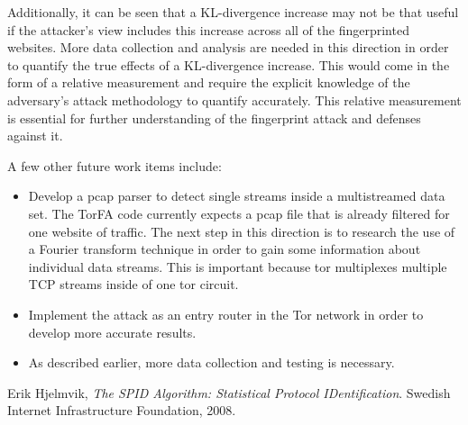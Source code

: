 \documentclass{usenixsubmit}
\begin{document}
Additionally, it can be seen that a KL-divergence increase may not be that 
useful if the attacker's view includes this increase across all of the 
fingerprinted websites. More data collection and analysis are needed in this 
direction in order to quantify the true effects of a KL-divergence increase. 
This would come in the form of a relative measurement and require the explicit 
knowledge of the adversary's attack methodology to quantify accurately. This 
relative measurement is essential for further understanding of the fingerprint 
attack and defenses against it.

A few other future work items include: 
\begin{itemize}
	\item Develop a pcap parser to detect single streams inside a 
		multistreamed data set. The TorFA code currently expects a pcap
		file that is already filtered for one website of traffic. The next
		step in this direction is to research the use of a Fourier transform 
		technique in order to gain some information about individual data 
		streams. This is important because tor multiplexes multiple TCP 
		streams inside of one tor circuit.
	\item Implement the attack as an entry router in the Tor network in order
		 to develop more accurate results. 
	\item As described earlier, more data collection and testing is necessary. 
\end{itemize}

\begin{thebibliography}{9}
		Erik Hjelmvik,
		\emph{The SPID Algorithm: Statistical Protocol IDentification}.
		Swedish Internet Infrastructure Foundation, 2008.
\end{thebibliography}

\appendix

%

%

%
\end{document}
